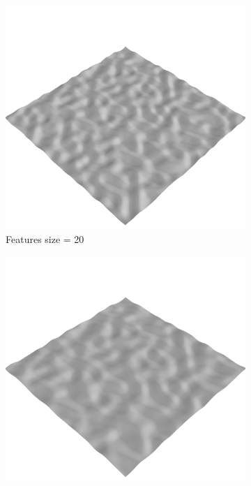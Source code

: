 \documentclass[../document.tex]{subfiles}
\begin{document}
\begin{figure}[htbp]
\begin{subfigure}[b]{0.23\linewidth}
            \includegraphics[width=\textwidth]{../img/data-aug/3d/simplex2.png}
            \caption{Features size = 20}
            \end{subfigure}    
          \begin{subfigure}[b]{0.23\textwidth}
            \includegraphics[width=\textwidth]{../img/data-aug/3d/simplex3.png}

\end{subfigure}
\end{figure}
\end{document}
